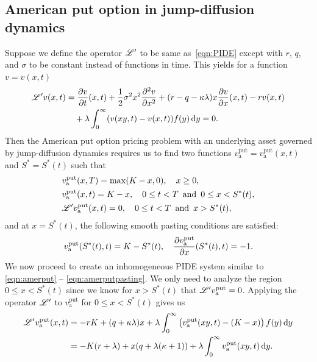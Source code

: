     \subsection{American put option in jump-diffusion dynamics}
     \label{sec:amerputJD}
     Suppose we define the operator $\mathscr L'$ to be same as~\eqref{eqn:PIDE} except with $r$, $q$, and $\sigma$ to be constant instead of functions in time. This yields for a function $v = v(x,t)$
   \begin{equation}
   	\label{eqn:PIDE2}
   	\begin{split}
   	\mathscr L'v(x,t) &= \frac{\partial v}{\partial t}(x,t) + \frac{1}{2}\sigma^2x^2\frac{\partial^2 v}{\partial x^2} + (r-q-\kappa\lambda)x\frac{\partial v}{\partial x}(x,t) - rv(x,t) \\
   	&{}\quad + \lambda\int_0^\infty (v(xy,t)-v(x,t))f(y) \, \mathrm d y = 0.
   	\end{split}
   \end{equation}
   Then the American put option pricing problem with an underlying asset governed by jump-diffusion dynamics requires us to find two functions $ v_{\text{a}}^{\text{put}} = v_{\text{a}}^{\text{put}}(x,t)$ and $S^* = S^*(t)$ such that
        \begin{equation}
        \label{eqn:amerputPIDE}
        \begin{split}
            &v_{\text{a}}^{\text{put}}(x,T) = \max(K-x,0), \quad x \geq 0, \\
            &v_{\text{a}}^{\text{put}}(x,t) = K-x, \quad 0 \leq t < T \enskip \text{and} \enskip 0 \leq x < S^*(t), \\
            &\mathscr{L'}v_{\text{a}}^{\text{put}}(x,t) = 0, \quad 0 \leq t < T \enskip \text{and} \enskip x > S^*(t),
        \end{split}
    \end{equation}
    and at $x = S^*(t)$, the following smooth pasting conditions are satisfied:
    	\begin{equation}
    		\label{eqn:amerputPIDEsmc}
    		v_{\text{a}}^{\text{put}}(S^*(t),t) = K - S^*(t), \quad \frac{\partial v_{\text{a}}^{\text{put}}}{\partial x}(S^*(t),t) = -1.
    	\end{equation}
    	We now proceed to create an inhomogeneous PIDE system similar to \eqref{eqn:amerput} -- \eqref{eqn:amerputpasting}. We only need to analyze the region $0 \leq x < S^*(t)$ since we know for $x > S^*(t)$ that $\mathscr L' v_{\text{a}}^{\text{put}} = 0$. Applying the operator $\mathscr L'$ to $v_{\text{a}}^{\text{put}}$ for $0 \leq x < S^*(t)$ gives us
        \begin{align*}
            \mathscr L'v_{\text{a}}^{\text{put}}(x,t) &= -rK + (q+\kappa\lambda)x + \lambda\int_0^\infty \left( v_{\text{a}}^{\text{put}}(xy,t) - (K-x)\right)f(y) \, \mathrm d y \\
            &= -K(r+\lambda) + x(q + \lambda(\kappa+1)) + \lambda\int_0^\infty v_{\text{a}}^{\text{put}}(xy,t) \, \mathrm d y.
        \end{align*}
